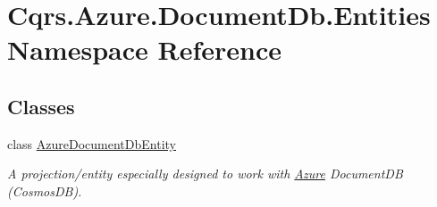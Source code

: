 \hypertarget{namespaceCqrs_1_1Azure_1_1DocumentDb_1_1Entities}{}\section{Cqrs.\+Azure.\+Document\+Db.\+Entities Namespace Reference}
\label{namespaceCqrs_1_1Azure_1_1DocumentDb_1_1Entities}
\subsection*{Classes}
\begin{DoxyCompactItemize}
\item 
class \hyperlink{classCqrs_1_1Azure_1_1DocumentDb_1_1Entities_1_1AzureDocumentDbEntity}{Azure\+Document\+Db\+Entity}
\begin{DoxyCompactList}\small\item\em A projection/entity especially designed to work with \hyperlink{namespaceCqrs_1_1Azure}{Azure} Document\+DB (Cosmos\+DB). \end{DoxyCompactList}\end{DoxyCompactItemize}
